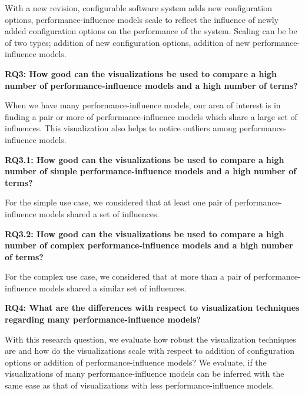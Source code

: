 With a new revision, configurable software system adds new configuration options, performance-influence models scale to reflect the influence of newly added configuration options on the performance of the system. Scaling can be be of two types; addition of new configuration options, addition of new performance-influence models.   

\begin{mdframed}
\textbf{RQ3: How good can the visualizations be used to compare a high number of performance-influence models and a high number of terms?}
\end{mdframed}

When we have many performance-influence models, our area of interest is in finding a pair or more of performance-influence models which share a large set of influences. This visualization also helps to notice outliers among performance-influence models.

\begin{mdframed} 
\textbf{RQ3.1: How good can the visualizations be used to compare a high number of simple performance-influence models and a high number of terms?}
\end{mdframed}

For the simple use case, we considered that at least one pair of performance-influence models shared a set of influences. 

\begin{mdframed} 
\textbf{RQ3.2: How good can the visualizations be used to compare a high number of complex performance-influence models and a high number of terms?}
\end{mdframed}

For the complex use case, we considered that at more than a pair of performance-influence models shared a similar set of influences.

\begin{mdframed}
\textbf{RQ4: What are the differences with respect to visualization techniques regarding many performance-influence models?}
\end{mdframed}

With this research question, we evaluate how robust the visualization techniques are and how do the visualizations scale with respect to addition of configuration options or addition of performance-influence models? We evaluate, if the visualizations of many performance-influence models can be inferred with the same ease as that of visualizations with less performance-influence models.

